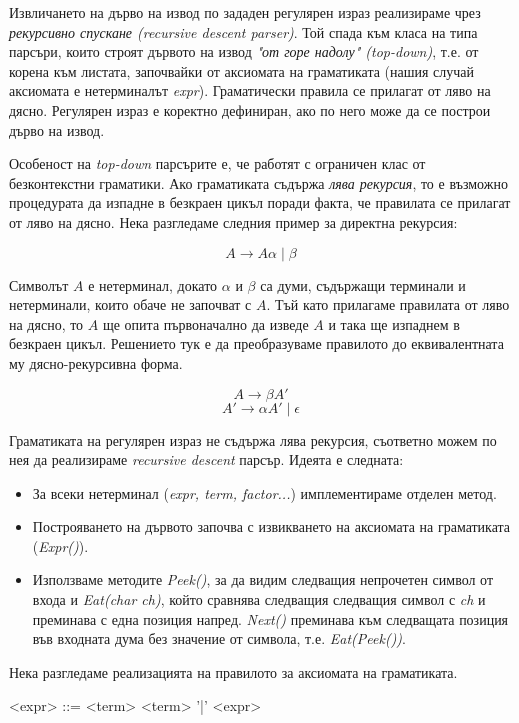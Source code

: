 \documentclass[12pt, oneside]{article}
\theoremstyle{definition}
\begin{document}
Извличането на дърво на извод по зададен регулярен израз реализираме чрез \emph{рекурсивно спускане (recursive descent parser)}. Той спада към класа на типа парсъри, които строят дървото на извод \emph{"от горе надолу" (top-down)}, т.е. от корена към листата, започвайки от аксиомата на граматиката (нашия случай аксиомата е нетерминалът \emph{expr}). Граматически правила се прилагат от ляво на дясно. Регулярен израз е коректно дефиниран, ако по него може да се построи дърво на извод.

Особеност на \emph{top-down} парсърите е, че работят с ограничен клас от безконтекстни граматики. Ако граматиката съдържа \emph{лява рекурсия}, то е възможно процедурата да изпадне в безкраен цикъл поради факта, че правилата се прилагат от ляво на дясно. Нека разгледаме следния пример за директна рекурсия:

\[ A \to A \alpha \mid \beta \]

Символът \(A\) е нетерминал, докато \( \alpha \) и \( \beta \) са думи, съдържащи терминали и нетерминали, които обаче не започват с \(A\). Тъй като прилагаме правилата от ляво на дясно, то \(A\) ще опита първоначално да изведе \(A\) и така ще изпаднем в безкраен цикъл. Решението тук е да преобразуваме правилото до еквивалентната му дясно-рекурсивна форма.

\[ A \to \beta A' \]
\[ A' \to \alpha A' \mid \epsilon \]

Граматиката на регулярен израз не съдържа лява рекурсия, съответно можем по нея да реализираме \emph{recursive descent} парсър. Идеята е следната:

\begin{itemize}
	\item За всеки нетерминал (\emph{expr, term, factor...}) имплементираме отделен метод.
	\item Построяването на дървото започва с извикването на аксиомата на граматиката (\emph{Expr()}).
	\item Използваме методите \emph{Peek()}, за да видим следващия непрочетен символ от входа и \emph{Eat(char ch)}, който сравнява следващия следващия символ с \emph{ch} и преминава с една позиция напред. \emph{Next()} преминава към следващата позиция във входната дума без значение от символа, т.е. \emph{Eat(Peek())}.
\end{itemize}

Нека разгледаме реализацията на правилото за аксиомата на граматиката.

\begin{grammar}
	<expr> ::= <term>
	\alt <term> '|' <expr>
\end{grammar}
\end{document}
